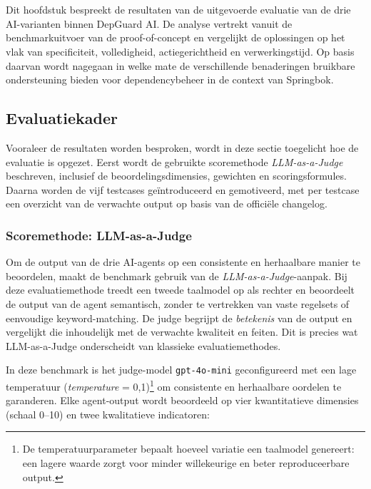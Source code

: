 
\chapter{}%
\label{ch:resultaten}

Dit hoofdstuk bespreekt de resultaten van de uitgevoerde evaluatie van de drie AI-varianten binnen DepGuard AI. De analyse vertrekt vanuit de benchmarkuitvoer van de proof-of-concept en vergelijkt de oplossingen op het vlak van specificiteit, volledigheid, actiegerichtheid en verwerkingstijd. Op basis daarvan wordt nagegaan in welke mate de verschillende benaderingen bruikbare ondersteuning bieden voor dependencybeheer in de context van Springbok.

\section{Evaluatiekader}
\label{sec:evaluatiekader}

Vooraleer de resultaten worden besproken, wordt in deze sectie toegelicht hoe de evaluatie is opgezet. Eerst wordt de gebruikte scoremethode \textit{LLM-as-a-Judge} beschreven, inclusief de beoordelingsdimensies, gewichten en scoringsformules. Daarna worden de vijf testcases geïntroduceerd en gemotiveerd, met per testcase een overzicht van de verwachte output op basis van de officiële changelog.

\subsection{Scoremethode: LLM-as-a-Judge}
\label{subsec:scoremethode}

Om de output van de drie AI-agents op een consistente en herhaalbare manier te beoordelen, maakt de benchmark gebruik van de \textit{LLM-as-a-Judge}-aanpak. Bij deze evaluatiemethode treedt een tweede taalmodel op als rechter en beoordeelt de output van de agent semantisch, zonder te vertrekken van vaste regelsets of eenvoudige keyword-matching. De judge begrijpt de \textit{betekenis} van de output en vergelijkt die inhoudelijk met de verwachte kwaliteit en feiten. Dit is precies wat LLM-as-a-Judge onderscheidt van klassieke evaluatiemethodes.

In deze benchmark is het judge-model \texttt{gpt-4o-mini} geconfigureerd met een lage temperatuur (\textit{temperature} = 0,1)\footnote{De temperatuurparameter bepaalt hoeveel variatie een taalmodel genereert: een lagere waarde zorgt voor minder willekeurige en beter reproduceerbare output.} om consistente en herhaalbare oordelen te garanderen. Elke agent-output wordt beoordeeld op vier kwantitatieve dimensies (schaal 0--10) en twee kwalitatieve indicatoren:


